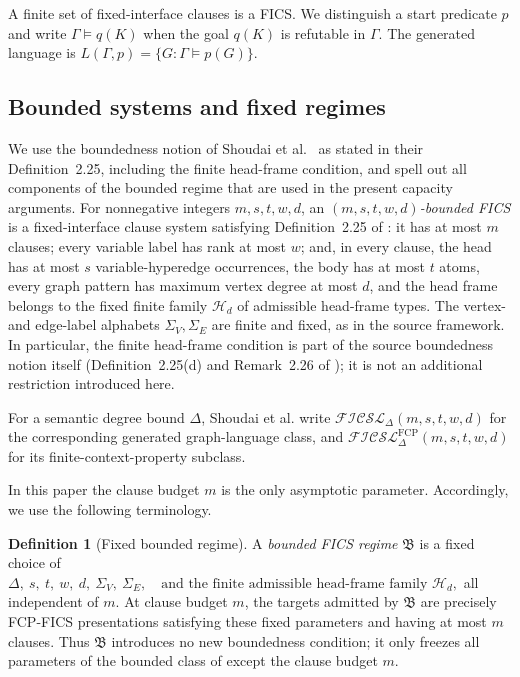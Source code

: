 \documentclass[11pt]{article}
\theoremstyle{definition}
\newtheorem{definition}[theorem]{Definition}
\theoremstyle{remark}
\begin{document}
A finite set of fixed-interface clauses is a FICS. We distinguish a start
predicate \(p\) and write
\(\Gamma\models q(K)\)
when the goal \(q(K)\) is refutable in \(\Gamma\). The generated language is
\(L(\Gamma,p)=\{G:\Gamma\models p(G)\}.\)

\subsection{Bounded systems and fixed regimes}

We use the boundedness notion of Shoudai et al.~\cite{ShoudaiEtAl2026}
as stated in their Definition~2.25, including the finite head-frame condition,
and spell out all components of the bounded regime that are used in the
present capacity arguments.  For nonnegative integers
\(m,s,t,w,d\), an
\emph{\((m,s,t,w,d)\)-bounded FICS} is a fixed-interface clause system
satisfying Definition~2.25 of \cite{ShoudaiEtAl2026}: it has at most \(m\)
clauses; every variable label has rank at most \(w\); and, in every clause,
the head has at most \(s\) variable-hyperedge occurrences, the body has at
most \(t\) atoms, every graph pattern has maximum vertex degree at most
\(d\), and the head frame belongs to the fixed finite family
\(\mathcal H_d\)
of admissible head-frame types.  The vertex- and edge-label alphabets
\(\Sigma_V,\Sigma_E\) are finite and fixed, as in the source framework.
In particular, the finite head-frame condition is part of the source
boundedness notion itself (Definition~2.25(d) and Remark~2.26 of
\cite{ShoudaiEtAl2026}); it is not an additional restriction introduced here.

For a semantic degree bound \(\Delta\), Shoudai et al. write
\(\mathcal{FICSL}_{\Delta}(m,s,t,w,d)\)
for the corresponding generated graph-language class, and
\(\mathcal{FICSL}^{\mathrm{FCP}}_{\Delta}(m,s,t,w,d)\)
for its finite-context-property subclass.

In this paper the clause budget \(m\) is the only asymptotic parameter.
Accordingly, we use the following terminology.

\begin{definition}[Fixed bounded regime]
\label{def:bounded-regime}
A \emph{bounded FICS regime} \(\mathfrak B\) is a fixed choice of
\(\Delta,\ s,\ t,\ w,\ d,\ \Sigma_V,\ \Sigma_E, \quad\text{and the finite admissible head-frame family }\mathcal H_d,\)
all independent of \(m\).  At clause budget \(m\), the targets admitted by
\(\mathfrak B\) are precisely FCP-FICS presentations satisfying these fixed
parameters and having at most \(m\) clauses.  Thus \(\mathfrak B\) introduces
no new boundedness condition; it only freezes all parameters of the bounded
class of \cite{ShoudaiEtAl2026} except the clause budget \(m\).
\end{definition}
\end{document}
